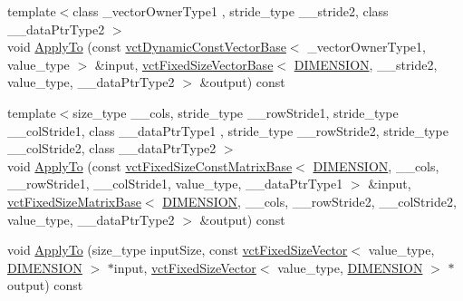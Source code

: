 \begin{DoxyCompactItemize}
\item 
{\footnotesize template$<$class \-\_\-vector\-Owner\-Type1 , stride\-\_\-type \-\_\-\-\_\-stride2, class \-\_\-\-\_\-data\-Ptr\-Type2 $>$ }\\void \hyperlink{classvct_frame_base_aeed92210c8340f7f91c7b876c01da974}{Apply\-To} (const \hyperlink{classvct_dynamic_const_vector_base}{vct\-Dynamic\-Const\-Vector\-Base}$<$ \-\_\-vector\-Owner\-Type1, value\-\_\-type $>$ \&input, \hyperlink{classvct_fixed_size_vector_base}{vct\-Fixed\-Size\-Vector\-Base}$<$ \hyperlink{classvct_frame_base_a4284a4e875533c13df90a20c0233e043ad25b85efd5e4c2687ddf38ae18cd88f0}{D\-I\-M\-E\-N\-S\-I\-O\-N}, \-\_\-\-\_\-stride2, value\-\_\-type, \-\_\-\-\_\-data\-Ptr\-Type2 $>$ \&output) const 
\item 
{\footnotesize template$<$size\-\_\-type \-\_\-\-\_\-cols, stride\-\_\-type \-\_\-\-\_\-row\-Stride1, stride\-\_\-type \-\_\-\-\_\-col\-Stride1, class \-\_\-\-\_\-data\-Ptr\-Type1 , stride\-\_\-type \-\_\-\-\_\-row\-Stride2, stride\-\_\-type \-\_\-\-\_\-col\-Stride2, class \-\_\-\-\_\-data\-Ptr\-Type2 $>$ }\\void \hyperlink{classvct_frame_base_a2c82a5452d057939840e8ae9aa2979a4}{Apply\-To} (const \hyperlink{classvct_fixed_size_const_matrix_base}{vct\-Fixed\-Size\-Const\-Matrix\-Base}$<$ \hyperlink{classvct_frame_base_a4284a4e875533c13df90a20c0233e043ad25b85efd5e4c2687ddf38ae18cd88f0}{D\-I\-M\-E\-N\-S\-I\-O\-N}, \-\_\-\-\_\-cols, \-\_\-\-\_\-row\-Stride1, \-\_\-\-\_\-col\-Stride1, value\-\_\-type, \-\_\-\-\_\-data\-Ptr\-Type1 $>$ \&input, \hyperlink{classvct_fixed_size_matrix_base}{vct\-Fixed\-Size\-Matrix\-Base}$<$ \hyperlink{classvct_frame_base_a4284a4e875533c13df90a20c0233e043ad25b85efd5e4c2687ddf38ae18cd88f0}{D\-I\-M\-E\-N\-S\-I\-O\-N}, \-\_\-\-\_\-cols, \-\_\-\-\_\-row\-Stride2, \-\_\-\-\_\-col\-Stride2, value\-\_\-type, \-\_\-\-\_\-data\-Ptr\-Type2 $>$ \&output) const 
\item 
void \hyperlink{classvct_frame_base_a31e0a2a5e96c33cb9fb7cf9f54e0b856}{Apply\-To} (size\-\_\-type input\-Size, const \hyperlink{classvct_fixed_size_vector}{vct\-Fixed\-Size\-Vector}$<$ value\-\_\-type, \hyperlink{classvct_frame_base_a4284a4e875533c13df90a20c0233e043ad25b85efd5e4c2687ddf38ae18cd88f0}{D\-I\-M\-E\-N\-S\-I\-O\-N} $>$ $\ast$input, \hyperlink{classvct_fixed_size_vector}{vct\-Fixed\-Size\-Vector}$<$ value\-\_\-type, \hyperlink{classvct_frame_base_a4284a4e875533c13df90a20c0233e043ad25b85efd5e4c2687ddf38ae18cd88f0}{D\-I\-M\-E\-N\-S\-I\-O\-N} $>$ $\ast$output) const 
\item 

\end{DoxyCompactItemize}
